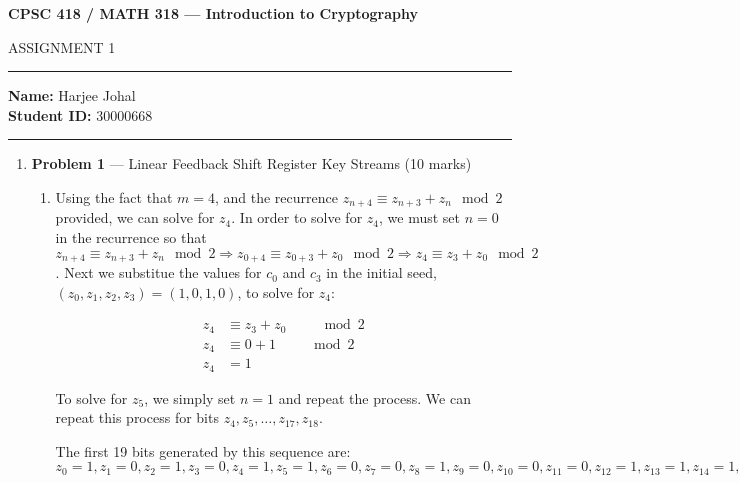 \documentclass[11pt]{article}
\theoremstyle{definition}
\begin{document}
\begin{center}
{\bf \Large CPSC 418 / MATH 318 --- Introduction to Cryptography

ASSIGNMENT 1 }
\end{center}

\hrule 	

\textbf{Name:} Harjee Johal\\
\textbf{Student ID:} 30000668

\medskip \hrule

\begin{enumerate} \itemsep 20pt

\item[] \textbf{Problem 1} --- Linear Feedback Shift Register Key Streams (10 marks)

\begin{enumerate}

\item Using the fact that $m = 4$, and the recurrence $z_{n+4} \equiv z_{n+3} + z_n \mod{2}$ provided, we can solve for $z_4$. In order to solve for $z_4$, we must set $n = 0$ in the recurrence so that $z_{n+4} \equiv z_{n+3} + z_n \mod{2}
\Rightarrow z_{0+4} \equiv z_{0+3} + z_0 \mod{2} \Rightarrow z_{4} \equiv z_{3} + z_0 \mod{2}$. Next we substitue the values for $c_0$ and $c_3$ in the initial seed, $(z_0, z_1, z_2, z_3) = (1, 0, 1, 0)$,  to solve for $z_4$:

\begin{align*}
z_4 &\equiv z_3 + z_0 \qquad \mod{2}\\
z_4 &\equiv 0 + 1 \qquad \mod{2}\\
z_4 &= 1
\end{align*}

To solve for $z_5$, we simply set $n = 1$ and repeat the process. We can repeat this process for bits $z_4, z_5, \ldots , z_{17}, z_{18}$.

The first 19 bits generated by this sequence are: $z_0 = 1, z_1 = 0, z_2 = 1, z_3 = 0, z_4 = 1, z_5 = 1, z_6 = 0, z_7 = 0, z_8 = 1, z_9 = 0, z_{10} = 0, z_{11} = 0, z_{12} = 1, z_{13} = 1, z_{14} = 1, z_{15} = 1, z_{16} = 0, z_{17} = 1, z_{18} = 0$\\


\end{enumerate}
\end{enumerate}
\end{document}
